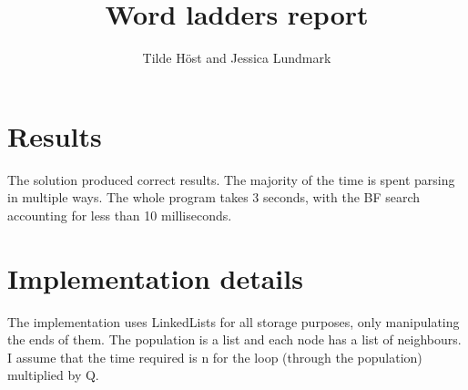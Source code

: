\documentclass{article}
\title{Word ladders report}
\author{Tilde Höst and Jessica Lundmark}
\begin{document}
  \maketitle

  \section{Results}

  The solution produced correct results. The majority of the time is spent parsing in multiple ways. The whole program takes 3 seconds, with the BF search accounting for less than 10 milliseconds.
  \section{Implementation details}

    The implementation uses LinkedLists for all storage purposes, only manipulating the ends of them. The population is a list and each node has a list of neighbours.
    I assume that the time required is n for the loop (through the population) multiplied by Q.
\end{document}
